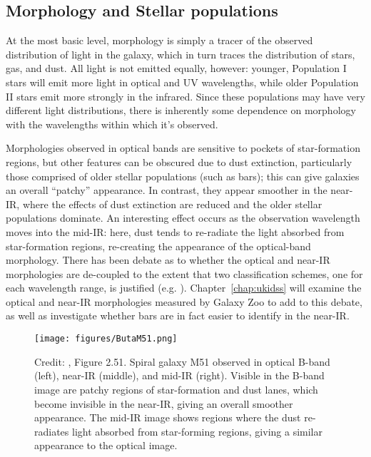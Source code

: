 \subsection{Morphology and Stellar populations}

At the most basic level, morphology is simply a tracer of the observed distribution of light in the galaxy, which in turn traces the distribution of stars, gas, and dust. All light is not emitted equally, however: younger, Population I stars will emit more light in optical and UV wavelengths, while older Population II stars emit more strongly in the infrared. Since these populations may have very different light distributions, there is inherently some dependence on morphology with the wavelengths within which it's observed. 

Morphologies observed in optical bands are sensitive to pockets of star-formation regions, but other features can be obscured due to dust extinction, particularly those comprised of older stellar populations (such as bars); this can give galaxies an overall ``patchy'' appearance. In contrast, they appear smoother in the near-IR, where the effects of dust extinction are reduced and the older stellar populations dominate. An interesting effect occurs as the observation wavelength moves into the mid-IR: here, dust tends to re-radiate the light absorbed from star-formation regions, re-creating the appearance of the optical-band morphology. There has been debate as to whether the optical and near-IR morphologies are de-coupled to the extent that two classification schemes, one for each wavelength range, is justified (e.g. \citet{Block1999}). Chapter~\ref{chap:ukidss} will examine the optical and near-IR morphologies measured by Galaxy Zoo to add to this debate, as well as investigate whether bars are in fact easier to identify in the near-IR.

\begin{figure}
\centering
\texttt{[image: figures/ButaM51.png]}
\caption{Credit: \citet{Buta2013}, Figure 2.51. Spiral galaxy M51 observed in optical B-band (left), near-IR (middle), and mid-IR (right). Visible in the B-band image are patchy regions of star-formation and dust lanes, which become invisible in the near-IR, giving an overall smoother appearance. The mid-IR image shows regions where the dust re-radiates light absorbed from star-forming regions, giving a similar appearance to the optical image. }
\label{fig:buta51}
\end{figure} 

